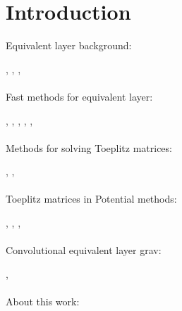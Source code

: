 \section{Introduction}

Equivalent layer background:

\cite{dampney1969}, \cite{blakely1996}, \cite{emilia1973}, \cite{li2014using}
\\\\
Fast methods for equivalent layer:

\cite{leao-silva1989}, \cite{mendonca-silva1994}, \cite{oliveirajr-etal2013}, \cite{li-oldenburg2010}, \cite{siqueira-etal2017}, \cite{mendoncca2020subspace}
\\\\
Methods for solving Toeplitz matrices:

\cite{golub-vanloan2013}, \cite{levinson1946}, \cite{chan-jin2007}
\\\\
Toeplitz matrices in Potential methods:

\cite{zhang-wong2015}, \citealp{zhang-etal2016}, \cite{hogue2020tutorial}, \cite{renaut2020fast}
\\\\
Convolutional equivalent layer grav:

\cite{siqueira-etal2017}, \cite{takahashi2020convolutional}
\\\\
About this work:

